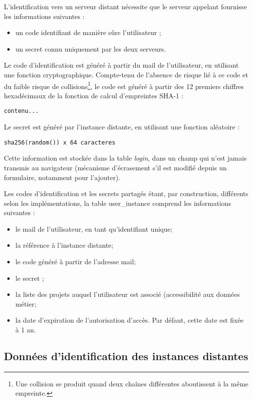 L'identification vers un serveur distant nécessite que le serveur appelant fournisse les informations suivantes :
\begin{itemize}
\item un code identifiant de manière sûre l'utilisateur ;
\item un secret connu uniquement par les deux serveurs.
\end{itemize}

Le code d'identification est généré à partir du mail de l'utilisateur, en utilisant une fonction cryptographique. Compte-tenu de l'absence de risque lié à ce code et du faible risque de collisions\footnote{Une collision se produit quand deux chaînes différentes aboutissent à la même empreinte.}, le code est généré à partir des 12 premiers chiffres hexadécimaux de la fonction de calcul d'empreintes SHA-1 :

\begin{lstlisting}
contenu...
\end{lstlisting}

Le secret est généré par l'instance distante, en utilisant une fonction aléatoire :
\begin{lstlisting}
sha256(random()) x 64 caracteres
\end{lstlisting}

Cette information est stockée dans la table \textit{login}, dans un champ qui n'est jamais transmis au navigateur (mécanisme d'écrasement s'il est modifié depuis un formulaire, notamment pour l'ajouter).

Les codes d'identification et les secrets partagés étant, par construction, différents selon les implémentations, la table user\_instance comprend les informations suivantes :
\begin{itemize}
\item le mail de l'utilisateur, en tant qu'identifiant unique;
\item la référence à l'instance distante;
\item le code généré à partir de l'adresse mail;
\item le secret ;
\item la liste des projets auquel l'utilisateur est associé (accessibilité aux données \og métier\fg{};
\item la date d'expiration de l'autorisation d'accès. Par défaut, cette date est fixée à 1 an.
\end{itemize}


\subsection{Données d'identification des instances distantes}
\label{table_instance}

